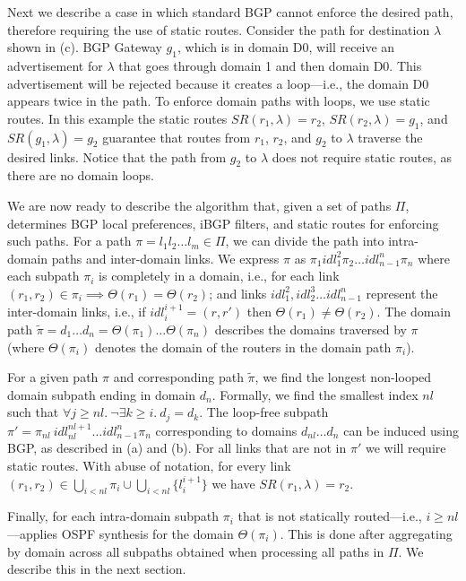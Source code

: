  \label{sec:static}
Next we describe a case in which standard BGP cannot enforce
the desired path, therefore requiring the use of static routes.
Consider the path for destination $\lambda$ 
shown in (c). BGP Gateway $g_1$, which is in
domain D0, 
will receive an advertisement for $\lambda$ that goes through domain
1 and then domain D0.
This advertisement will be rejected because it creates a loop---i.e., the domain D0
appears twice in the path. 
To enforce domain paths with loops, we use static routes. In this example
the static routes
$SR(r_1,\lambda) = r_2$, $SR(r_2,\lambda) = g_1$, and $SR(g_1,\lambda) = g_2$ 
guarantee that routes from $r_1$, $r_2$, and $g_2$ to $\lambda$ traverse the desired links.
Notice that the path from $g_2$ to $\lambda$ does not 
require static routes, as there are no domain loops.

We are now ready to describe the algorithm that,
given a set of paths $\Pi$, determines
BGP local preferences, iBGP filters, and static routes for enforcing such paths.
For a path $\pi = l_1 l_2 \ldots l_m \in \Pi$, we
can divide the path into intra-domain paths and inter-domain
links. We express $\pi$ as 
$\pi_1 idl_1^2 \pi_2 \ldots idl_{n-1}^n \pi_n$ where
each subpath $\pi_i$ is completely in a
domain, i.e., for each 
link $(r_1,r_2) \in \pi_i \implies \Theta(r_1) = \Theta(r_2)$;
and links $idl_1^2, idl_2^3 \ldots idl_{n-1}^n$ 
represent the inter-domain links, i.e., 
if $idl_i^{i+1}=(r,r')$ then $\Theta(r_1) \neq \Theta(r_2)$. 
The domain path
$\tilde{\pi} = d_1 \ldots d_n=\Theta(\pi_1)\ldots \Theta(\pi_n)$ describes the 
domains traversed by $\pi$ (where
$\Theta(\pi_i)$ denotes the domain of the routers in the 
domain path $\pi_i$). 


For a given path $\pi$ and corresponding path $\tilde{\pi}$,
we find the longest non-looped domain subpath ending in domain
$d_n$. Formally, we find the smallest index $nl$ such that
$\forall j \geq nl. ~\neg\exists k \geq i.~d_j = d_k$. 
The loop-free subpath $\pi'=\pi_{nl} ~idl_{nl}^{nl+1}\ldots idl_{n-1}^n \pi_n$ corresponding to
domains $d_{nl} \ldots d_n$
can be induced using BGP, as described in (a)
and (b).
For all links that are not in $\pi'$
we will require static routes.
With abuse of notation, for every link $(r_1,r_2)\in\bigcup_{i< nl} \pi_i\cup \bigcup_{i< nl}\{l_i^{i+1}\}$ 
we have
$SR(r_1, \lambda) = r_2$.

Finally, for each intra-domain subpath $\pi_i$ that is not statically routed---i.e., $i\geq nl$---\name applies
OSPF synthesis for the domain $\Theta(\pi_i)$. 
This is done after aggregating by domain across all subpaths obtained when processing all paths in $\Pi$.
We describe this in the next section.



